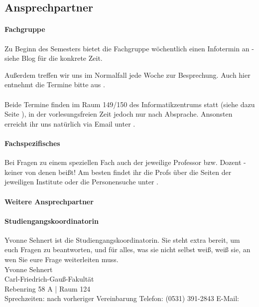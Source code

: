 
\subsection{Ansprechpartner}
\paragraph{Fachgruppe}
Zu Beginn des Semesters bietet die Fachgruppe wöchentlich einen Infotermin an - siehe Blog für die konkrete Zeit.

Außerdem treffen wir uns im Normalfall jede Woche zur
Besprechung. Auch hier entnehmt die Termine bitte aus
.
\\\\
Beide Termine finden im Raum 149/150 des Informatikzentrums statt
(siehe dazu Seite \pageref{campuskarte}), in der vorlesungsfreien Zeit
jedoch nur nach Absprache. Ansonsten erreicht ihr uns natürlich via
Email unter .

\paragraph{Fachspezifisches}
Bei Fragen zu einem speziellen Fach auch der jeweilige Professor
bzw. Dozent - keiner von denen beißt! Am besten findet ihr die Profs
über die Seiten der jeweiligen Institute oder die Personensuche unter
.
\paragraph{Weitere Ansprechpartner}
\paragraph{\small Studiengangskoordinatorin} Yvonne Sehnert ist die Studiengangskoordinatorin. Sie steht extra bereit,
um euch Fragen zu beantworten, und für alles, was sie nicht selbst
weiß, weiß sie, an wen Sie eure Frage weiterleiten muss.\\
{
Yvonne Sehnert\\
Carl-Friedrich-Gauß-Fakultät\\
Rebenring 58 A | Raum 124\\
Sprechzeiten: nach vorheriger Vereinbarung
Telefon: (0531) 391-2843
E-Mail: 
}

